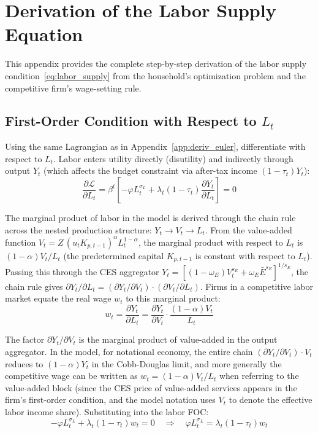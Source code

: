 \documentclass[12pt, a4paper]{article}
\begin{document}
	\section{Derivation of the Labor Supply Equation} \label{app:deriv_labor}
	
	This appendix provides the complete step-by-step derivation of the labor supply condition~\eqref{eq:labor_supply} from the household's optimization problem and the competitive firm's wage-setting rule.
	
	\subsection*{First-Order Condition with Respect to $L_t$}
	
	Using the same Lagrangian as in Appendix~\ref{app:deriv_euler}, differentiate with respect to $L_t$. Labor enters utility directly (disutility) and indirectly through output $Y_t$ (which affects the budget constraint via after-tax income $(1-\tau_t)Y_t$):
	\begin{equation*}
		\frac{\partial \mathcal{L}}{\partial L_t}
		= \beta^t\left[-\varphi L_t^{\sigma_L} + \lambda_t (1-\tau_t) \frac{\partial Y_t}{\partial L_t}\right] = 0
	\end{equation*}
	
	\noindent The marginal product of labor in the model is derived through the chain rule across the nested production structure: $Y_t \to V_t \to L_t$. From the value-added function $V_t = Z\,(u_t K_{p,t-1})^\alpha L_t^{1-\alpha}$, the marginal product with respect to $L_t$ is $(1-\alpha)V_t/L_t$ (the predetermined capital $K_{p,t-1}$ is constant with respect to $L_t$). Passing this through the CES aggregator $Y_t = [(1-\omega_E)V_t^{s_E} + \omega_E \bar{E}^{s_E}]^{1/s_E}$, the chain rule gives $\partial Y_t/\partial L_t = (\partial Y_t / \partial V_t)\cdot(\partial V_t / \partial L_t)$. Firms in a competitive labor market equate the real wage $w_t$ to this marginal product:
	\begin{equation*}
		w_t = \frac{\partial Y_t}{\partial L_t}
		= \frac{\partial Y_t}{\partial V_t} \cdot \frac{(1-\alpha)V_t}{L_t}
	\end{equation*}
	
	The factor $\partial Y_t / \partial V_t$ is the marginal product of value-added in the output aggregator. In the model, for notational economy, the entire chain $(\partial Y_t/\partial V_t)\cdot V_t$ reduces to $(1-\alpha)Y_t$ in the Cobb-Douglas limit, and more generally the competitive wage can be written as $w_t = (1-\alpha) V_t / L_t$ when referring to the value-added block (since the CES price of value-added services appears in the firm's first-order condition, and the model notation uses $V_t$ to denote the effective labor income share). Substituting into the labor FOC:
	\begin{equation*}
		-\varphi L_t^{\sigma_L} + \lambda_t (1-\tau_t) w_t = 0
		\quad \Longrightarrow \quad
		\varphi L_t^{\sigma_L} = \lambda_t (1-\tau_t) w_t
	\end{equation*}
	
\end{document}
